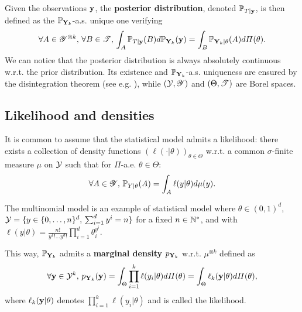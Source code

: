 Given the observations $\mathbf{y}$, the \textbf{posterior distribution}, denoted $\mathbb{P}_{T|\mathbf{y}}$, is then defined as the $\mathbb{P}_{\mathbf{Y}_k}$-a.s. unique one verifying
    \begin{equation}
        \forall A\in\mathscr{Y}^{\otimes k},\,\forall B\in\mathscr{T},\, \int_{A}\mathbb{P}_{T|\mathbf{y}}(B)d\mathbb{P}_{\mathbf{Y}_k}(\mathbf{y}) = \int_B \mathbb{P}_{\mathbf{Y}_k|\theta}(A)d\varPi(\theta).
    \end{equation}
We can notice that the posterior distribution is always absolutely continuous w.r.t. the prior distribution.
Its existence and $\mathbb{P}_{\mathbf{Y}_k}$-a.s. uniqueness are ensured by the disintegration theorem (see e.g. \cite{chang_conditioning_1997}), while $(\mathcal{Y},\mathscr{Y})$ and $(\Theta,\mathscr{T})$ are Borel spaces.



\subsection{Likelihood and densities}\label{sec:intro-ref:likelihoods}


It is common to assume that the statistical model admits a likelihood: there exists a collection of density functions $(\ell(\cdot|\theta))_{\theta\in\Theta}$  w.r.t. a common  $\sigma$-finite measure $\mu$ on $\mathcal{Y}$ such that for $\varPi$-a.e. $\theta\in\Theta$:
    \begin{equation}
        \forall A\in\mathscr{Y},\,\mathbb{P}_{Y|\theta}(A) = \int_A\ell(y|\theta)d\mu(y).
    \end{equation}


\begin{ex}\label{ex:intro-ref:multinomialmodel}
    The multinomial model is an example of statistical model where $\theta\in(0,1)^d$, $\mathcal{Y}=\{y\in\{0,\dots,n\}^d,\,\sum_{i=1}^dy^i=n\} $ for a fixed $n\in\mathbb{N}^\ast$, and with
        $%
            \ell(y|\theta) = \frac{n!}{y^1!\dots y^d!}\prod_{i=1}^d\theta_i^{y^i}.
        $%
\end{ex}


This way, $\mathbb{P}_{\mathbf{Y}_k}$ admits a \textbf{marginal density} $p_{\mathbf{Y}_k}$ w.r.t. $\mu^{\otimes k}$ defined as
    \begin{equation}
        \forall\mathbf{y}\in\mathcal{Y}^k,\, p_{\mathbf{Y}_k}(\mathbf{y}) = \int_\Theta\prod_{i=1}^k\ell(y_i|\theta) d\varPi(\theta) = \int_\Theta \ell_k(\mathbf{y}|\theta)d\varPi(\theta),
    \end{equation}
where $\ell_k(\mathbf{y}|\theta)$ denotes $\prod_{i=1}^k\ell(y_i|\theta)$ and is called the likelihood.

